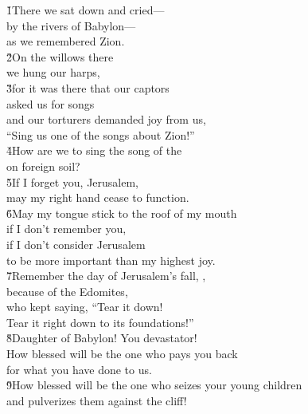 \begin{poetry}
\poeml \v{1}There we sat down and cried--- \\
\poemll    by the rivers of Babylon--- \\
\poemlll       as we remembered Zion. \\
\poeml \v{2}On the willows there \\
\poemll    we hung our harps, \\
\poeml \v{3}for it was there that our captors \\
\poemll    asked us for songs \\
\poeml and our torturers demanded joy from us, \\
\poemll    ``Sing us one of the songs about Zion!'' \\
\poeml \v{4}How are we to sing the song of the  \\
\poemll    on foreign soil? \\
\poeml \v{5}If I forget you, Jerusalem, \\
\poemll    may my right hand cease to function. \\
\poeml \v{6}May my tongue stick to the roof of my mouth \\
\poemll    if I don't remember you, \\
\poeml if I don't consider Jerusalem \\
\poemll    to be more important than my highest joy. \\
\poeml \v{7}Remember the day of Jerusalem's fall, , \\
\poemll    because of the Edomites, \\
\poeml who kept saying, ``Tear it down! \\
\poemll    Tear it right down to its foundations!'' \\
\poeml \v{8}Daughter of Babylon! You devastator! \\
\poemll    How blessed will be the one who pays you back \\
\poemlll       for what you have done to us. \\
\poeml \v{9}How blessed will be the one who seizes your young children \\
\poemll    and pulverizes them against the cliff!
\end{poetry}

